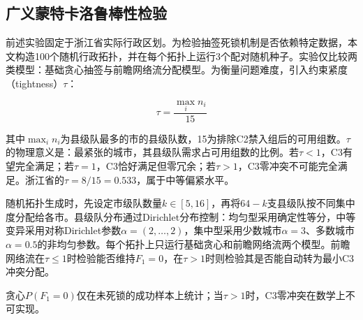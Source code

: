 \documentclass[12pt,a4paper]{article}
\begin{document}
\subsection{广义蒙特卡洛鲁棒性检验}

前述实验固定于浙江省实际行政区划。为检验抽签死锁机制是否依赖特定数据，本文构造100个随机行政拓扑，并在每个拓扑上运行3个配对随机种子。实验仅比较两类模型：基础贪心抽签与前瞻网络流分配模型。为衡量问题难度，引入约束紧度（tightness）$\tau$：

\begin{equation}
  \tau = \frac{\max_i n_i}{15}
  \label{eq:tau}
\end{equation}

其中$\max_i n_i$为县级队最多的市的县级队数，15为排除C2禁入组后的可用组数。$\tau$的物理意义是：最紧张的城市，其县级队需求占可用组数的比例。若$\tau < 1$，C3有望完全满足；若$\tau = 1$，C3恰好满足但零冗余；若$\tau > 1$，C3零冲突不可能完全满足。浙江省的$\tau = 8/15 = 0.533$，属于中等偏紧水平。

随机拓扑生成时，先设定市级队数量$k\in[5,16]$，再将$64-k$支县级队按不同集中度分配给各市。县级队分布通过Dirichlet分布控制：均匀型采用确定性等分，中等变异采用对称Dirichlet参数$\alpha=(2,\dots,2)$，集中型采用少数城市$\alpha=3$、多数城市$\alpha=0.5$的非均匀参数。每个拓扑上只运行基础贪心和前瞻网络流两个模型。前瞻网络流在$\tau \le 1$时检验能否维持$F_1=0$，在$\tau>1$时则检验其是否能自动转为最小C3冲突分配。

\begin{table}[H]
  \centering
  \caption{不同紧度区间下的基础贪心与前瞻网络流对比（100个随机拓扑）}
  \label{tab:generalized}
  \small
  \setlength{\tabcolsep}{3pt}
  \vspace{2pt}
  \parbox{\textwidth}{\footnotesize *贪心$P(F_1{=}0)$仅在未死锁的成功样本上统计；当$\tau>1$时，C3零冲突在数学上不可实现。}
\end{table}
\end{document}
